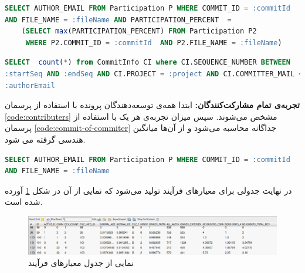 \begin{latin}
\begin{lstlisting}[language=SQL]
SELECT AUTHOR_EMAIL FROM Participation P WHERE COMMIT_ID = :commitId 
AND FILE_NAME = :fileName AND PARTICIPATION_PERCENT  = 
	(SELECT max(PARTICIPATION_PERCENT) FROM Participation P2 
	 WHERE P2.COMMIT_ID = :commitId  AND P2.FILE_NAME = :fileName)
\end{lstlisting}
\end{latin}
\label{code:find-owner}



\begin{latin}
\begin{lstlisting}[language=SQL]
SELECT  count(*) from CommitInfo CI where CI.SEQUENCE_NUMBER BETWEEN
:startSeq AND :endSeq AND CI.PROJECT = :project AND CI.COMMITTER_MAIL =
:authorEmail
\end{lstlisting}
\end{latin}
\label{code:commit-of-commiter}

\textbf{‫تجربه‌ی تمام مشارکت‌کنندگان:‬}
ابتدا همه‌ی توسعه‌دهندگان پرونده با استفاده از پرسمان \ref{code:contributers} مشخص می‌شوند.  سپس میزان تجربه‌ی هر یک با استفاده از پرسمان \ref{code:commit-of-commiter} جداگانه محاسبه می‌شود و از آن‌ها میانگین هندسی گرفته می شود. 
\begin{latin}
\begin{lstlisting}[language=SQL]
SELECT AUTHOR_EMAIL FROM Participation P WHERE COMMIT_ID = :commitId 
AND FILE_NAME = :fileName
\end{lstlisting}
\end{latin}
\label{code:contributers}


در نهایت جدولی برای معیارهای فرآیند تولید می‌شود که نمایی از آن در شکل \ref{fig:process-metics} آورده شده است. 
\begin{figure}[H]
	\centering
	\includegraphics[width=1\textwidth]{img/case_study/process-metrics.png}
	\caption{نمایی از جدول معیارهای فرآیند }
	\label{fig:process-metics}
\end{figure}


